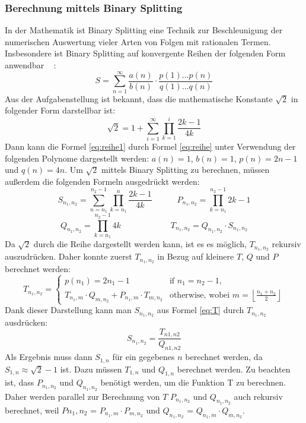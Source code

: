 \documentclass[course=erap]{aspdoc}
\begin{document}
\subsubsection{Berechnung mittels Binary Splitting} 
In der Mathematik ist Binary Splitting eine Technik zur Beschleunigung der numerischen Auswertung vieler Arten von Folgen mit rationalen Termen. Insbesondere ist Binary Splitting auf konvergente Reihen der folgenden Form anwendbar ~\cite{BinarySplitting} :
\begin{equation}
S = \sum_{n=1}^{\infty} \frac{a(n)}{b(n)} \cdot \frac{p(1)...p(n)}{q(1)...q(n)}
\label{eq:reihe}
\end{equation}
Aus der Aufgabenstellung ist bekannt, dass die mathematische Konstante $\sqrt{2}$ in folgender Form darstellbar ist:
\begin{equation} 
\sqrt{2} = 1 + \sum_{i=1}^{\infty} \prod_{k=1}^i \frac{2k - 1}{4k} 
\label{eq:reihe1}
\end{equation}
Dann kann die Formel \ref{eq:reihe1} durch Formel \ref{eq:reihe}  unter Verwendung der folgenden Polynome dargestellt werden:
$a(n) = 1$, $b(n) = 1$, $p(n) = 2n - 1$ und $q(n) = 4n$. Um $\sqrt{2}$ mittels Binary Splitting zu berechnen, müssen außerdem die folgenden Formeln ausgedrückt werden:
\begin{equation} 
S_{n_{1}, n_{2}} = \sum_{n = n_{1}}^ {n_{2} - 1} {\prod_{k = n_{1}}^{n} \frac{2k - 1}{4k}} \quad \quad \quad 
P_{n_{1}, n_{2}} = \prod_{k = n_{1}}^{n_{2} - 1} {2k - 1}
\end{equation}
\begin{equation} 
Q_{n_{1}, n_{2}} = \prod_{k = n_{1}}^{n_{2} - 1} {4k} \quad \quad \quad  \quad \quad \quad 
T_{n_{1}, n_{2}} = Q_{n_{1}, n_{2}} \cdot S_{n_{1}, n_{2}}
\end{equation}
Da $\sqrt{2}$ durch die Reihe\label{reihe} dargestellt werden kann, ist es es möglich, $T_{n_{1}, n_{2}}$ rekursiv auszudrücken. Daher konnte zuerst $T_{n_{1}, n_{2}}$ in Bezug auf kleinere $T$, $Q$ und $P$ berechnet werden:
\begin{equation} 
T_{n_{1}, n_{2}} = 
\begin{cases}
 p(n_{1}) = 2 n_{1} - 1 & \text{if $n_{1} = n_{2} - 1$,}\\
T_{n_{1}, m}  \cdot Q_{m, n_{2}} + P_{n_{1}, m} \cdot T_{m, n_{2}} & \text{otherwise, wobei $m = \left \lfloor \frac{n_{1} + n_{2}}{2} \right \rfloor$}
\end{cases}
\label{eq:T}
\end{equation}
Dank dieser Darstellung kann man $S_{n_{1}, n_{2}}$ aus Formel \ref{eq:T} durch $T_{n_{1}, n_{2}}$ ausdrücken:
\begin{equation} 
S_{n_{1}, n_{2}} = \frac{T_{n1, n2}}{Q_{n1, n2}}
\end{equation} 
Als Ergebnis muss dann $S_{1, n}$ für ein gegebenes $n$ berechnet werden, da $S_{1, n} \approx \sqrt{2} - 1$ ist. Dazu müssen  $T_{1, n}$ und $Q_{1, n}$ berechnet werden. Zu beachten ist, dass $P_{n_{1}, n_{2}}$ und $Q_{n_{1}, n_{2}}$ benötigt werden, um die Funktion T zu berechnen. Daher werden parallel zur Berechnung von $T$ $P_  {n_{1}, n_{2}}$ und $Q_{n_{1}, n_{2}}$ auch rekursiv berechnet, weil $P{n_{1}, n_{2}}$ = $P_{n_{ 1}, m} \cdot P_{m, n_{2}}$ und $Q_{n_{1}, n_{2}}$ = $Q_{n_{1}, m} \cdot Q_{ m, n_ {2}}$.
\end{document}
